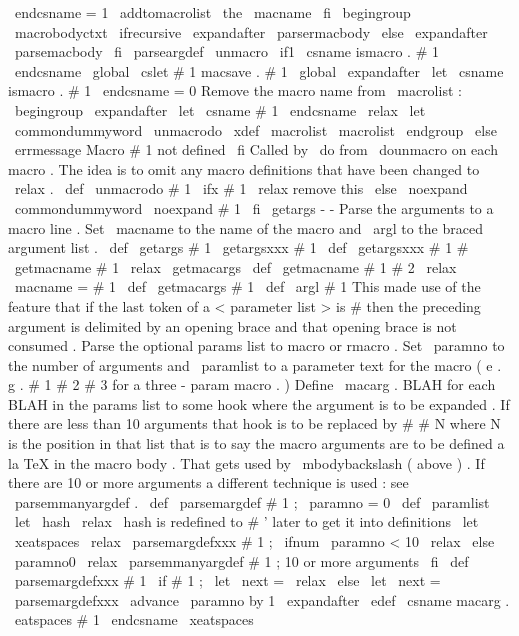 {{{{\
endcsname
=
1
%
\
addtomacrolist
{
\
the
\
macname
}
%
\
fi
\
begingroup
\
macrobodyctxt
\
ifrecursive
\
expandafter
\
parsermacbody
\
else
\
expandafter
\
parsemacbody
\
fi
}
\
parseargdef
\
unmacro
{
%
\
if1
\
csname
ismacro
.
#
1
\
endcsname
\
global
\
cslet
{
#
1
}
{
macsave
.
#
1
}
%
\
global
\
expandafter
\
let
\
csname
ismacro
.
#
1
\
endcsname
=
0
%
%
Remove
the
macro
name
from
\
macrolist
:
\
begingroup
\
expandafter
\
let
\
csname
#
1
\
endcsname
\
relax
\
let
\
commondummyword
\
unmacrodo
\
xdef
\
macrolist
{
\
macrolist
}
%
\
endgroup
\
else
\
errmessage
{
Macro
#
1
not
defined
}
%
\
fi
}
%
Called
by
\
do
from
\
dounmacro
on
each
macro
.
The
idea
is
to
omit
any
%
macro
definitions
that
have
been
changed
to
\
relax
.
%
\
def
\
unmacrodo
#
1
{
%
\
ifx
#
1
\
relax
%
remove
this
\
else
\
noexpand
\
commondummyword
\
noexpand
#
1
%
\
fi
}
%
\
getargs
-
-
Parse
the
arguments
to
a
macro
line
.
Set
\
macname
to
%
the
name
of
the
macro
and
\
argl
to
the
braced
argument
list
.
\
def
\
getargs
#
1
{
\
getargsxxx
#
1
{
}
}
\
def
\
getargsxxx
#
1
#
{
\
getmacname
#
1
\
relax
\
getmacargs
}
\
def
\
getmacname
#
1
#
2
\
relax
{
\
macname
=
{
#
1
}
}
\
def
\
getmacargs
#
1
{
\
def
\
argl
{
#
1
}
}
%
This
made
use
of
the
feature
that
if
the
last
token
of
a
%
<
parameter
list
>
is
#
then
the
preceding
argument
is
delimited
by
%
an
opening
brace
and
that
opening
brace
is
not
consumed
.
%
Parse
the
optional
{
params
}
list
to
macro
or
rmacro
.
%
Set
\
paramno
to
the
number
of
arguments
%
and
\
paramlist
to
a
parameter
text
for
the
macro
(
e
.
g
.
#
1
#
2
#
3
for
a
%
three
-
param
macro
.
)
Define
\
macarg
.
BLAH
for
each
BLAH
in
the
params
%
list
to
some
hook
where
the
argument
is
to
be
expanded
.
If
there
are
%
less
than
10
arguments
that
hook
is
to
be
replaced
by
#
#
N
where
N
%
is
the
position
in
that
list
that
is
to
say
the
macro
arguments
are
to
be
%
defined
a
la
TeX
in
the
macro
body
.
%
%
That
gets
used
by
\
mbodybackslash
(
above
)
.
%
%
If
there
are
10
or
more
arguments
a
different
technique
is
used
:
see
%
\
parsemmanyargdef
.
%
\
def
\
parsemargdef
#
1
;
{
%
\
paramno
=
0
\
def
\
paramlist
{
}
%
\
let
\
hash
\
relax
%
\
hash
is
redefined
to
#
'
later
to
get
it
into
definitions
\
let
\
xeatspaces
\
relax
\
parsemargdefxxx
#
1
;
%
\
ifnum
\
paramno
<
10
\
relax
\
else
\
paramno0
\
relax
\
parsemmanyargdef
#
1
;
%
10
or
more
arguments
\
fi
}
\
def
\
parsemargdefxxx
#
1
{
%
\
if
#
1
;
\
let
\
next
=
\
relax
\
else
\
let
\
next
=
\
parsemargdefxxx
\
advance
\
paramno
by
1
\
expandafter
\
edef
\
csname
macarg
.
\
eatspaces
{
#
1
}
\
endcsname
{
\
xeatspaces
}}}}}
